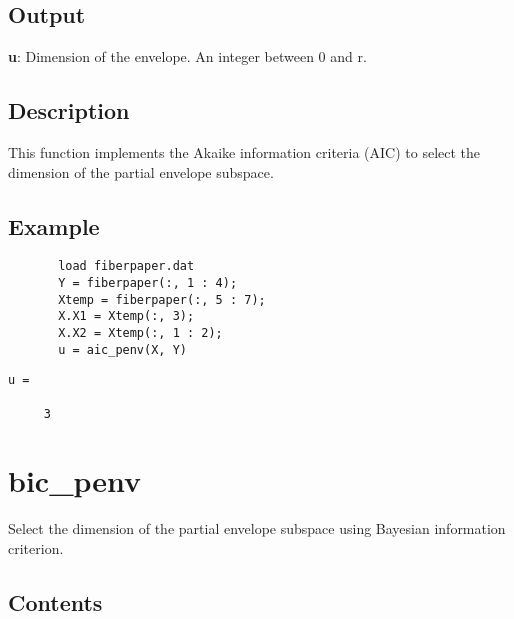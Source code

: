 \documentclass[a4paper,11pt,openany]{memoir}
\begin{document}
\subsection*{Output}

\begin{par}
\textbf{u}: Dimension of the envelope. An integer between 0 and r.
\end{par} \vspace{1em}


\subsection*{Description}

\begin{par}
This function implements the Akaike information criteria (AIC) to select the dimension of the partial envelope subspace.
\end{par} \vspace{1em}


\subsection*{Example}


\begin{verbatim}       load fiberpaper.dat
       Y = fiberpaper(:, 1 : 4);
       Xtemp = fiberpaper(:, 5 : 7);
       X.X1 = Xtemp(:, 3);
       X.X2 = Xtemp(:, 1 : 2);
       u = aic_penv(X, Y)\end{verbatim}
    
        \color{lightgray}\ttfamily \begin{verbatim}
u =

     3

\end{verbatim} \rmfamily
\color{black}
    

\newpage

\rmfamily
\color{black}\section{bic\_penv}

\begin{par}
Select the dimension of the partial envelope subspace using Bayesian information criterion.
\end{par} \vspace{1em}

\subsection*{Contents}
\end{document}
